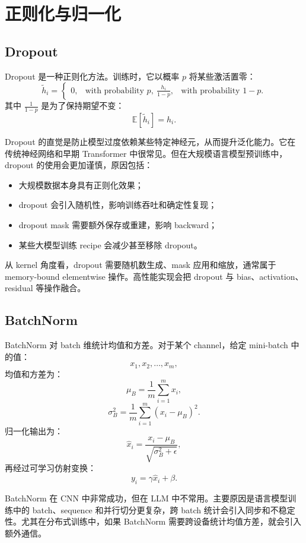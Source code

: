 \section{正则化与归一化}
\label{sec:regularization-normalization}

\subsection{Dropout}
\label{subsec:dropout}

Dropout 是一种正则化方法。训练时，它以概率 $p$ 将某些激活置零：
\[
\tilde{h}_i=
\begin{cases}
0, & \text{with probability }p,\
\frac{h_i}{1-p}, & \text{with probability }1-p.
\end{cases}
\]
其中 $\frac{1}{1-p}$ 是为了保持期望不变：
\[
\mathbb{E}[\tilde{h}_i]=h_i.
\]

Dropout 的直觉是防止模型过度依赖某些特定神经元，从而提升泛化能力。它在传统神经网络和早期 Transformer 中很常见。但在大规模语言模型预训练中，dropout 的使用会更加谨慎，原因包括：

\begin{itemize}
\item 大规模数据本身具有正则化效果；
\item dropout 会引入随机性，影响训练吞吐和确定性复现；
\item dropout mask 需要额外保存或重建，影响 backward；
\item 某些大模型训练 recipe 会减少甚至移除 dropout。
\end{itemize}

从 kernel 角度看，dropout 需要随机数生成、mask 应用和缩放，通常属于 memory-bound elementwise 操作。高性能实现会把 dropout 与 bias、activation、residual 等操作融合。

\subsection{BatchNorm}
\label{subsec:batchnorm}

BatchNorm 对 batch 维统计均值和方差。对于某个 channel，给定 mini-batch 中的值：
\[
x_1,x_2,\ldots,x_m,
\]
均值和方差为：
\[
\mu_B=\frac{1}{m}\sum_{i=1}^{m}x_i,
\]
\[
\sigma_B^2=\frac{1}{m}\sum_{i=1}^{m}(x_i-\mu_B)^2.
\]
归一化输出为：
\[
\hat{x}_i=\frac{x_i-\mu_B}{\sqrt{\sigma_B^2+\epsilon}},
\]
再经过可学习仿射变换：
\[
y_i=\gamma\hat{x}_i+\beta.
\]

BatchNorm 在 CNN 中非常成功，但在 LLM 中不常用。主要原因是语言模型训练中的 batch、sequence 和并行切分更复杂，跨 batch 统计会引入同步和不稳定性。尤其在分布式训练中，如果 BatchNorm 需要跨设备统计均值方差，就会引入额外通信。

